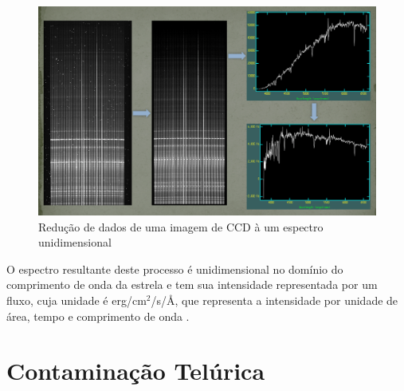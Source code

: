 
\begin{figure}[htb]
\centering
\includegraphics[width=15cm]{figuras/calibration_steps.jpg}
\caption{Redução de dados de uma imagem de CCD à um espectro unidimensional \citep{data-reduction-image}}
\label{fig:calibration-steps}
\end{figure}

O espectro resultante deste processo é unidimensional no domínio do comprimento de onda da estrela e tem sua intensidade representada por um fluxo, cuja unidade é erg/cm\(^{2}\)/s/Å, que representa a intensidade por unidade de área, tempo e comprimento de onda \citep{astronomical-measurements}.





\section{Contaminação Telúrica} \label{telluric-contamination}

